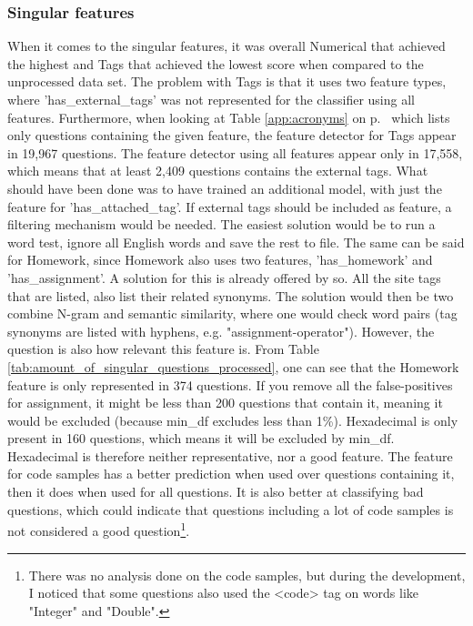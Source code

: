 \subsubsection{Singular features}
When it comes to the singular features, it was overall Numerical that achieved the highest and Tags that achieved the lowest score when compared to the unprocessed data set.
The problem with Tags is that it uses two feature types, where 'has\_external\_tags' was not represented for the classifier using all features.
Furthermore, when looking at Table \ref{app:acronyms} on p.~\pageref{app:acronyms} which lists only questions containing the given feature, the feature detector for Tags appear in 19,967 questions.
The feature detector using all features appear only in 17,558, which means that at least 2,409 questions contains the external tags.
What should have been done was to have trained an additional model, with just the feature for 'has\_attached\_tag'.
If external tags should be included as feature, a filtering mechanism would be needed.
The easiest solution would be to run a word test, ignore all English words and save the rest to file.
\vspace{0.5em}\newline
The same can be said for Homework, since Homework also uses two features, 'has\_homework' and 'has\_assignment'.
A solution for this is already offered by \gls{so}.
All the site tags that are listed, also list their related synonyms.
The solution would then be two combine N-gram and semantic similarity, where one would check word pairs (tag synonyms are listed with hyphens, e.g. "assignment-operator").
However, the question is also how relevant this feature is. 
From Table \ref{tab:amount_of_singular_questions_processed}, one can see that the Homework feature is only represented in 374 questions.
If you remove all the false-positives for assignment, it might be less than 200 questions that contain it, meaning it would be excluded (because min\_df excludes less than 1\%).
\vspace{0.5em}\newline
Hexadecimal is only present in 160 questions, which means it will be excluded by min\_df. 
Hexadecimal is therefore neither representative, nor a good feature. 
\vspace{0.5em}\newline
The feature for code samples has a better prediction when used over questions containing it, then it does when used for all questions. 
It is also better at classifying bad questions, which could indicate that questions including a lot of code samples is not considered a good question\footnote{
	There was no analysis done on the code samples, but during the development, I noticed that some questions also used the <code> tag on words like "Integer" and "Double".
}.


